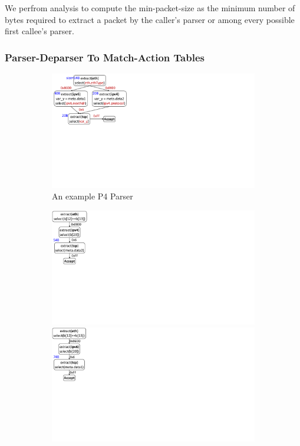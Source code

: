 \documentclass[letterpaper,twocolumn,10pt]{article}
\begin{document}
We perfrom analysis to compute the min-packet-size as 
the minimum number of bytes required to extract a packet by the 
caller's parser or among every possible first callee's parser.

\subsubsection{Parser-Deparser To Match-Action Tables}
\label{subsection:parser-to-match-action-table}
\begin{figure}[!ht]
    \begin{subfigure}[b]{0.25\linewidth}
        \centering
        \includegraphics[trim=4 270 596 0, clip,scale=0.37]{parser-transformation-example}    
        \caption{An example P4 Parser}
        \label{subfig:parser}
    \end{subfigure}
    \begin{subfigure}[b]{0.26\linewidth}
        \centering
        \includegraphics[trim=0 285 794 0, clip,scale=0.37]{parser-example-se-1}
        \includegraphics[trim=0 285 794 0, clip,scale=0.37]{parser-example-se-2}

\end{subfigure}
\end{figure}
\end{document}
